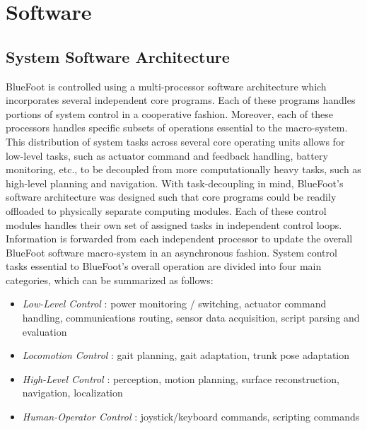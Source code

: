 \label{ch::software}
\chapter{Software}
	
	\section{System Software Architecture}
	
	BlueFoot is controlled using a multi-processor software architecture which incorporates several independent core programs. Each of these programs handles portions of system control in a cooperative fashion. Moreover, each of these processors handles specific subsets of operations essential to the macro-system. This distribution of system tasks across several core operating units allows for low-level tasks, such as actuator command and feedback handling, battery monitoring, etc., to be decoupled from more computationally heavy tasks, such as high-level planning and navigation. With task-decoupling in mind, BlueFoot's software architecture was designed such that core programs could be readily offloaded to physically separate computing modules. Each of these control modules handles their own set of assigned tasks in independent control loops. Information is forwarded from each independent processor to update the overall BlueFoot software macro-system in an asynchronous fashion. System control tasks essential to BlueFoot's overall operation are divided into four main categories, which can be summarized as follows:
		\begin{itemize}
			\item{
			\emph{Low-Level Control} : 
				power monitoring / switching, 
				actuator command handling, 
				communications routing,
				sensor data acquisition,
				script parsing and evaluation
			}
			\item{
			\emph{Locomotion Control} : 
				gait planning, 
				gait adaptation, 
				trunk pose adaptation
			}
			\item{
			\emph{High-Level Control} : 
				perception, 
				motion planning, 
				surface reconstruction, 
				navigation, 
				localization
			}
			\item{
			\emph{Human-Operator Control} : 
				joystick/keyboard commands,
				scripting commands
			}
		\end{itemize}
